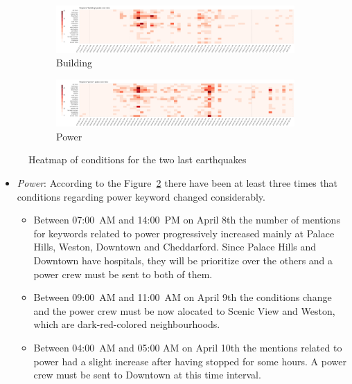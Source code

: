 \begin{figure}[!h]
\begin{subfigure}[!h]{0.92\textwidth}
        \includegraphics[width=1.00\textwidth]{figs/q2/build_2_3_heat.png}
        \caption{Building}
        \label{fig:building_2_3_heat}
    \end{subfigure}
    \begin{subfigure}[!h]{0.92\textwidth}
        \centering
        \includegraphics[width=1.00\textwidth]{figs/q2/power_2_3_heat.png}
        \caption{Power}
        \label{fig:power_2_3_heat}
    \end{subfigure}
    \caption{Heatmap of conditions for the two last earthquakes}
    \label{fig:eq_cond_2_3_heat}
\end{figure}

\begin{itemize}
    \item \emph{Power}: According to the Figure~\ref{fig:power_2_3_heat} there
    have been at least three times that conditions regarding power keyword
    changed considerably.
    \begin{itemize}                                                              
        \item Between 07:00~AM and 14:00~PM on April 8th the number of mentions
        for keywords related to power progressively increased mainly at Palace
        Hills, Weston, Downtown and Cheddarford. Since Palace Hills and Downtown
        have hospitals, they will be prioritize over the others and a power crew
        must be sent to both of them.
        \item Between 09:00~AM and 11:00~AM on April 9th the conditions change
        and the power crew must be now alocated to Scenic View and Weston, which
        are dark-red-colored neighbourhoods.
        \item Between 04:00~AM and 05:00 AM on April 10th the mentions related
        to power had a slight increase after having stopped for some hours. A
        power crew must be sent to Downtown at this time interval.
      \end{itemize}
\end{itemize}          
